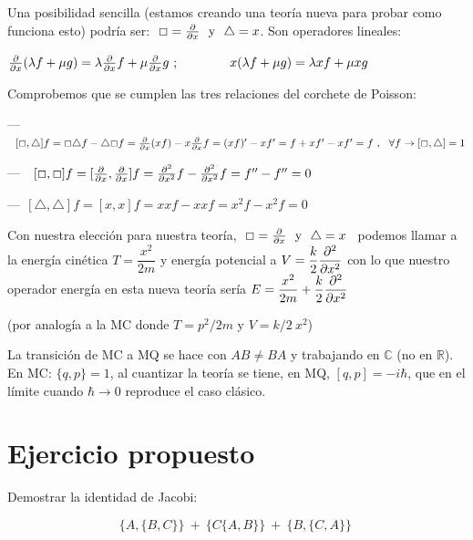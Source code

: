 \begin{ejemplo}
\begin{small}
Una posibilidad sencilla (estamos creando una teoría nueva para probar como funciona esto) podría ser: $\ \Box=\pdv{x} \ \text{ y } \ \triangle=x$. Son operadores lineales:

$\pdv{x}(\lambda f + \mu g)=\lambda \pdv{x} f + \mu \pdv{x} g \ ; \qquad \qquad x(\lambda f + \mu g)=\lambda x f + \mu x g$

Comprobemos que se cumplen las tres relaciones del corchete de Poisson:

--- $\ \ [\Box, \triangle ] f=\Box \triangle f - \triangle \Box f = \pdv{x} (xf)-x\pdv{x}f=(xf)'-xf'=f+xf'-xf'=f \ , \ \  \forall f \to  [\Box, \triangle ] =1$

--- $\ \ [\Box, \Box]f=[\pdv x, \pdv x] f =\pdv[2]{x} f -\pdv[2]{x}f=f''-f''=0$

---$\ \ [\triangle,\triangle ]f=[x,x]f=xxf-xxf=x^2f-x^2f=0$

Con nuestra elección para nuestra teoría, $\ \Box=\pdv{x} \ \text{ y } \ \triangle=x \, \ $ podemos llamar a la energía cinética $T=\dfrac {x^2}{2m}$ y energía potencial a $V=\displaystyle \dfrac k 2 \pdv[2]{x}$ con lo que nuestro operador energía en esta nueva teoría sería $E=\displaystyle \dfrac {x^2}{2m} +\dfrac k 2 \pdv[2]{x} \quad$ 
\begin{footnotesize}
 (por analogía a la MC donde $T=p^2/2m$ y $V=k/2\ x^2$)	
\end{footnotesize}


La transición de MC a MQ se hace con $AB\neq BA$ y trabajando en $\mathbb C$ (no en $\mathbb R$). En MC: $\{q,p\}=1$, al cuantizar la teoría se tiene, en MQ, $[q,p]=-i\hbar$, que en el límite cuando $\hbar \to 0$ reproduce el caso clásico.
\end{small}
\color{black}
\end{ejemplo}






\vspace{10mm}
\section{Ejercicio propuesto}

\vspace{5mm}
\begin{ejercicio}
\begin{adjustwidth}{10pt}{10pt}
Demostrar la identidad de Jacobi:

$$ \{A,\{B,C\}\}\ + \ \{C\{A,B\}\} \ + \ \{B,\{C,A\}\}\ $$


\end{adjustwidth} 	
\end{ejercicio}

